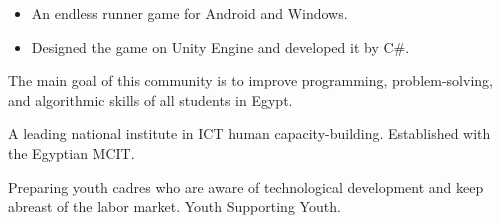 \documentclass[10pt,a4paper,ragged2e,withhyper]{altacv}
\begin{document}
\begin{paracol}{2}
\begin{itemize}
    \item An endless runner game for Android and Windows.
    \item Designed the game on Unity Engine and developed it by C\#.
\end{itemize}


The main goal of this community is to improve programming, problem-solving, and algorithmic skills of all students in Egypt.

\divider

A leading national institute in ICT human capacity-building. Established with the Egyptian MCIT.

\divider

Preparing youth cadres who are aware of technological development and keep abreast of the labor market. Youth Supporting Youth.

\switchcolumn





\end{paracol}
\end{document}
